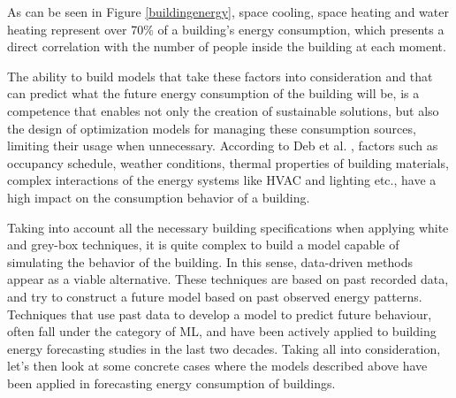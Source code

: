 As can be seen in Figure \ref{buildingenergy}, space cooling, space heating and water heating represent  over 70\% of a building's energy consumption, which presents a direct correlation with  the number of people inside the building at each moment.

The ability to build models that take these factors into consideration and that can predict what the future energy consumption of the building will be, is a competence that enables not only the creation of sustainable solutions, but also the design of optimization models for managing these consumption sources, limiting their usage when unnecessary. According to Deb et al. \cite{reviewtsf}, factors such as occupancy schedule, weather conditions, thermal properties of building materials, complex interactions of the energy systems like \ac{HVAC} and lighting etc., have a high impact on the consumption behavior of a building. 

Taking into account all the necessary building specifications when applying white and grey-box techniques, it is quite complex to build a model capable of simulating the behavior of the building. In this sense, data-driven methods appear as a viable alternative. These techniques are based on past recorded data, and try to construct a future model based on past observed energy patterns. Techniques that use past data to develop a model to predict future behaviour, often fall under the category of \ac{ML}, and have been actively applied to building energy forecasting studies in the last two decades. Taking all into consideration, let's then look at some concrete cases where the models described above have been applied in forecasting energy consumption of buildings.


